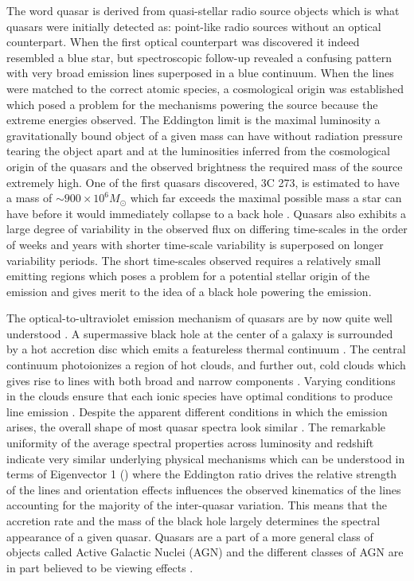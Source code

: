 The word quasar is derived from quasi-stellar radio source objects which is what
quasars were initially detected as: point-like radio sources without an optical
counterpart. When the first optical counterpart was discovered it indeed
resembled a blue star, but spectroscopic follow-up revealed a confusing pattern
with very broad emission lines superposed in a blue continuum. When the lines
were matched to the correct atomic species, a cosmological origin was
established which posed a problem for the mechanisms powering the source because
the extreme energies observed. The Eddington limit is the maximal luminosity a
gravitationally bound object of a given mass can have without radiation pressure
tearing the object apart and at the luminosities inferred from the cosmological
origin of the quasars and the observed brightness the required mass of the
source extremely high. One of the first quasars discovered, 3C 273, is estimated
to have a mass of $\sim900 \times 10^{6} M_\odot$ \citep{Peterson2004} which far
exceeds the maximal possible mass a star can have before it would immediately
collapse to a back hole \citep{Belczynski2010}. Quasars also exhibits a large
degree of variability in the observed flux on differing time-scales in the order
of weeks and years with shorter time-scale variability is superposed on longer
variability periods. The short time-scales observed requires a relatively small
emitting regions which poses a problem for a potential stellar origin of the
emission and gives merit to the idea of a black hole powering the emission.

The optical-to-ultraviolet emission mechanism of quasars are by now quite well
understood \citep{Elvis1994}. A supermassive black hole at the center of a
galaxy is surrounded by a hot accretion disc which emits a featureless thermal
continuum \citep{Shakura1973, Pereyra2006}. The central continuum photoionizes a
region of hot clouds, and further out, cold clouds which gives rise to lines
with both broad and narrow components \citep{Elvis2001}.  Varying conditions in
the clouds ensure that each ionic species have optimal conditions to produce
line emission \citep{Baldwin1995}. Despite the apparent different conditions in
which the emission arises, the overall shape of most quasar spectra look similar
\citep{Dietrich2002}. The remarkable uniformity of the average spectral
properties across luminosity and redshift indicate very similar underlying
physical mechanisms which can be understood in terms of Eigenvector 1
(\citep{Boroson1992, Francis1992}) where the Eddington ratio drives the relative
strength of the lines and orientation effects influences the observed kinematics
of the lines \citep{Shen2014a} accounting for the majority of the inter-quasar
variation. This means that the accretion rate and the mass of the black hole
largely determines the spectral appearance of a given quasar. Quasars are a part
of a more general class of objects called Active Galactic Nuclei (AGN) and the
different classes of AGN are in part believed to be viewing effects
\citep{Elvis2001}.


